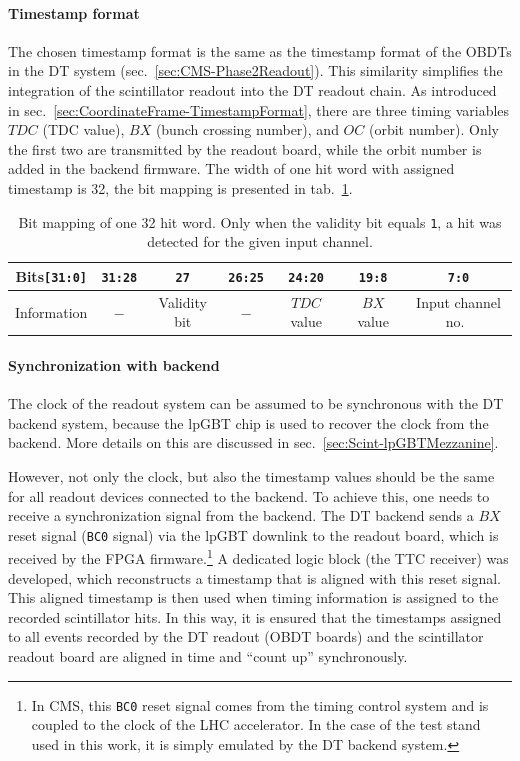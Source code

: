 \paragraph{Timestamp format}
The chosen timestamp format is the same as the timestamp format of the \acp{OBDT} in the \ac{DT} system (sec.\ \ref{sec:CMS-Phase2Readout}). This similarity simplifies the integration of the scintillator readout into the \ac{DT} readout chain. As introduced in sec.\ \ref{sec:CoordinateFrame-TimestampFormat}, there are three timing variables $TDC$ (TDC value), $BX$ (bunch crossing number), and $OC$ (orbit number). Only the first two are transmitted by the readout board, while the orbit number is added in the backend firmware. The width of one hit word with assigned timestamp is \SI{32}{\bit}, the bit mapping is presented in tab.\ \ref{tab:Scint-ReadoutFirmware-Timestamp-Bits}.
\begin{table}[htb]
    \centering
    \begin{tabular}{|c||c|c|c|c|c|c|} 
        \hline
        Bits\texttt{[31:0]} & \texttt{31:28} & \texttt{27} & \texttt{26:25} & \texttt{24:20} & \texttt{19:8} & \texttt{7:0} \\ \hline
        Information & $-$ & Validity bit & $-$ & $TDC$ value & $BX$ value & Input channel no.\ \\ \hline
    \end{tabular}
    \caption{Bit mapping of one \SI{32}{\bit} hit word. Only when the validity bit equals \texttt{1}, a hit was detected for the given input channel.}
    \label{tab:Scint-ReadoutFirmware-Timestamp-Bits}
\end{table}
\paragraph{Synchronization with backend}
The clock of the readout system can be assumed to be synchronous with the \ac{DT} backend system, because the \ac{lpGBT} chip is used to recover the clock from the backend. More details on this are discussed in sec.\ \ref{sec:Scint-lpGBTMezzanine}.
\par However, not only the clock, but also the timestamp values should be the same for all readout devices connected to the backend. To achieve this, one needs to receive a synchronization signal from the backend. The \ac{DT} backend sends a $BX$ reset signal (\texttt{BC0} signal) via the \ac{lpGBT} downlink to the readout board, which is received by the \ac{FPGA} firmware.\footnote{In \ac{CMS}, this \texttt{BC0} reset signal comes from the timing control system and is coupled to the clock of the \ac{LHC} accelerator. In the case of the test stand used in this work, it is simply emulated by the \ac{DT} backend system.} A dedicated logic block (the TTC receiver) was developed, which reconstructs a timestamp that is aligned with this reset signal. This aligned timestamp is then used when timing information is assigned to the recorded scintillator hits. In this way, it is ensured that the timestamps assigned to all events recorded by the \ac{DT} readout (\ac{OBDT} boards) and the scintillator readout board are aligned in time and \enquote{count up} synchronously.

